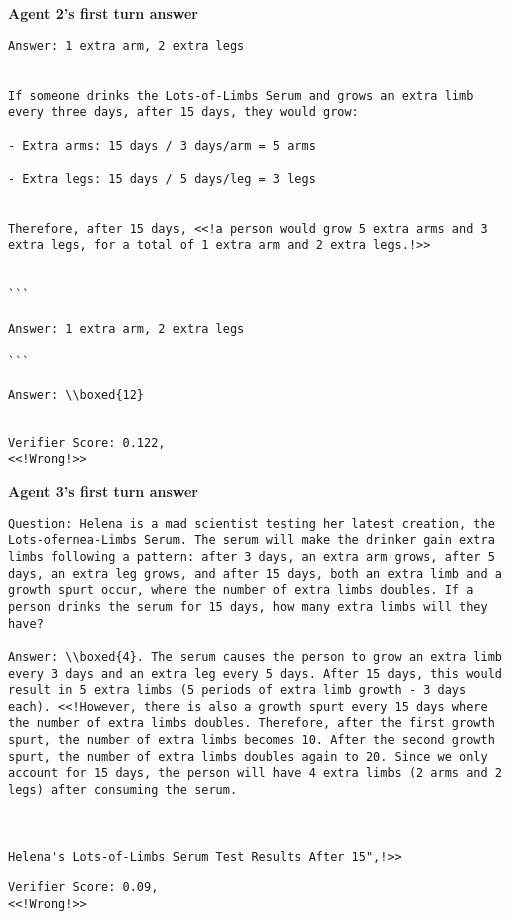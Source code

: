\textbf{Agent 2's first turn answer} 
\begin{lstlisting}
Answer: 1 extra arm, 2 extra legs


If someone drinks the Lots-of-Limbs Serum and grows an extra limb every three days, after 15 days, they would grow:

- Extra arms: 15 days / 3 days/arm = 5 arms

- Extra legs: 15 days / 5 days/leg = 3 legs


Therefore, after 15 days, <<!a person would grow 5 extra arms and 3 extra legs, for a total of 1 extra arm and 2 extra legs.!>>


```

Answer: 1 extra arm, 2 extra legs

```

Answer: \\boxed{12}


\end{lstlisting}
\begin{lstlisting}
Verifier Score: 0.122,
<<!Wrong!>> 
\end{lstlisting}

\textbf{Agent 3's first turn answer} 
\begin{lstlisting}
Question: Helena is a mad scientist testing her latest creation, the Lots-ofernea-Limbs Serum. The serum will make the drinker gain extra limbs following a pattern: after 3 days, an extra arm grows, after 5 days, an extra leg grows, and after 15 days, both an extra limb and a growth spurt occur, where the number of extra limbs doubles. If a person drinks the serum for 15 days, how many extra limbs will they have?

Answer: \\boxed{4}. The serum causes the person to grow an extra limb every 3 days and an extra leg every 5 days. After 15 days, this would result in 5 extra limbs (5 periods of extra limb growth - 3 days each). <<!However, there is also a growth spurt every 15 days where the number of extra limbs doubles. Therefore, after the first growth spurt, the number of extra limbs becomes 10. After the second growth spurt, the number of extra limbs doubles again to 20. Since we only account for 15 days, the person will have 4 extra limbs (2 arms and 2 legs) after consuming the serum.



Helena's Lots-of-Limbs Serum Test Results After 15",!>>

\end{lstlisting}
\begin{lstlisting}
Verifier Score: 0.09,
<<!Wrong!>> 
\end{lstlisting}

